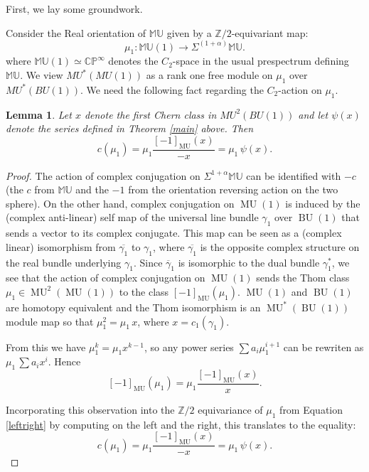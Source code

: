 \documentclass[12pt]{amsart}
\numberwithin{equation}{section}
\theoremstyle{plain}  %
\newtheorem{lemma}[equation]{Lemma}
\theoremstyle{definition}  %
\newcommand{\Z}{\mathbb{Z}}
\newcommand{\MU}{\mathbb {MU}}
\DeclareMathOperator{\BUg}{BU}
\DeclareMathOperator{\MUg}{MU}
\begin{document}
First, we lay some groundwork. 

Consider the Real orientation of $\MU$ 
given by a $\Z/2$-equivariant map: 
\begin{equation} 
\label{leftright}
\mu_1 : \MU(1) \longrightarrow \Sigma^{(1+\alpha)} \MU. 
\end{equation} 
where $\MU(1) \simeq \mathbb{CP}^\infty$ denotes the $C_2$-space in the usual prespectrum defining $\MU$. We view $MU^*(MU(1))$ as a rank one free module on $\mu_1$ over $MU^*(BU(1))$. We need the following fact regarding the $C_2$-action on $\mu_1$.

\bigskip
\begin{lemma}\label{action} Let $x$ denote the first Chern class in $MU^2(BU(1))$ and let $\psi(x)$ denote the series defined in Theorem \ref{main} above. Then
$$
c(\mu_1) = \mu_1 \frac{[-1]_{\MUg} (x)}{-x} 
= 
 \mu_1 \, \psi(x). 
$$

\end{lemma}
\begin{proof} The action of complex conjugation on $\Sigma^{1+\alpha} 
\MU$ can be identified with $-c$ (the $c$ from $\MU$
and the $-1$ from the orientation reversing action on the
two sphere). On the other hand, complex conjugation on $\MUg(1)$ is induced 
by the (complex anti-linear) self map of the universal line 
bundle $\gamma_1$ over $\BUg(1)$ that sends a vector to its 
complex conjugate. This map can be seen as a (complex linear) 
isomorphism from $\overline{\gamma_1}$ to $\gamma_1$, 
where $\overline{\gamma_1}$ is the opposite complex 
structure on the real bundle underlying $\gamma_1$. 
Since $\overline{\gamma}_1$ is isomorphic to the dual 
bundle $\gamma_1^*$, we see that the action of complex 
conjugation on $\MUg(1)$ sends the Thom class $\mu_1 \in 
\MUg^2(\MUg(1))$ to the class $[-1]_{\MUg} (\mu_1)$. 
$\MUg(1)$ and $\BUg(1)$ are homotopy equivalent and the Thom
isomorphism is an $\MUg^*(\BUg(1))$ module map so
that $\mu_1^2 = \mu_1 \, x$, 
where $x = c_1(\gamma_1)$. 

From this we have $\mu_1^k = \mu_1 x^{k-1}$, so any power series  $\sum a_i \mu_1^{i+1}$
can be rewriten as $\mu_1 \, \sum a_i x^i$.
Hence 
$$[-1]_{\MUg} (\mu_1) = \mu_1 \frac{[-1]_{\MUg} (x)}{x}.$$

Incorporating this observation into the $\Z/2$ 
equivariance of $\mu_1$ from Equation \eqref{leftright}
by computing on the left and the right, this
translates to the equality: 
$$
c(\mu_1) = \mu_1 \frac{[-1]_{\MUg} (x)}{-x} 
= 
 \mu_1 \, \psi(x). 
$$
\end{proof} 
\end{document}
